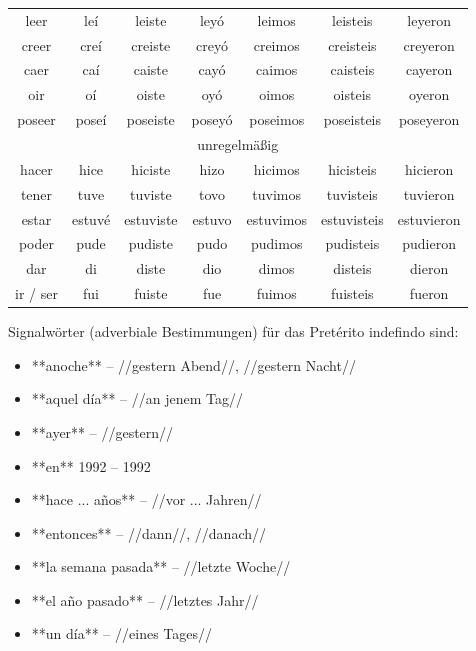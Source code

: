 \begin{tabular}{ccccccc}
leer & leí & leiste & leyó & leimos & leisteis & leyeron \\
creer & creí & creiste & creyó & creimos & creisteis & creyeron \\
caer & caí & caiste & cayó & caimos & caisteis & cayeron \\
oir & oí & oiste & oyó & oimos & oisteis & oyeron \\
poseer & poseí & poseiste & poseyó & poseimos & poseisteis & poseyeron \\
\hline
\multicolumn{7}{c}{unregelmäßig} \\
\hline
hacer & hice & hiciste & hizo & hicimos & hicisteis & hicieron \\
tener & tuve & tuviste & tovo & tuvimos & tuvisteis & tuvieron \\
estar & estuvé & estuviste & estuvo & estuvimos & estuvisteis & estuvieron \\
poder & pude & pudiste & pudo & pudimos & pudisteis & pudieron \\
dar & di & diste & dio & dimos & disteis & dieron \\
ir / ser & fui & fuiste & fue & fuimos & fuisteis & fueron \\
\hline
\end{tabular}

Signalwörter (adverbiale Bestimmungen) für das Pretérito indefindo sind:

\begin{itemize}
    \item **anoche** -- //gestern Abend//, //gestern Nacht//
    \item **aquel día** -- //an jenem Tag//
    \item **ayer** -- //gestern//
    \item **en** 1992 -- 1992
    \item **hace ... años** -- //vor ... Jahren//
    \item **entonces** -- //dann//, //danach//
    \item **la semana pasada** -- //letzte Woche//
    \item **el año pasado** -- //letztes Jahr//
    \item **un día** -- //eines Tages//
\end{itemize}
